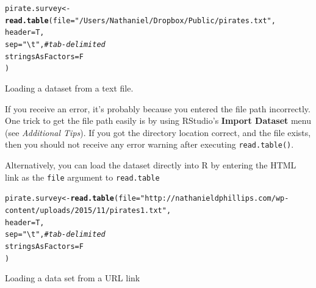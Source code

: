\documentclass{tufte-book}\usepackage[]{graphicx}\usepackage[]{color}
\makeatletter
\newcommand{\hlstr}[1]{\textcolor[rgb]{0.192,0.494,0.8}{#1}}%
\newcommand{\hlcom}[1]{\textcolor[rgb]{0.678,0.584,0.686}{\textit{#1}}}%
\newcommand{\hlstd}[1]{\textcolor[rgb]{0.345,0.345,0.345}{#1}}%
\newcommand{\hlkwb}[1]{\textcolor[rgb]{0.69,0.353,0.396}{#1}}%
\newcommand{\hlkwc}[1]{\textcolor[rgb]{0.333,0.667,0.333}{#1}}%
\newcommand{\hlkwd}[1]{\textcolor[rgb]{0.737,0.353,0.396}{\textbf{#1}}}%
\newenvironment{kframe}{%
 \def\at@end@of@kframe{}%
 \ifinner\ifhmode%
  \def\at@end@of@kframe{\end{minipage}}%
  \begin{minipage}{\columnwidth}%
 \fi\fi%
 \def\FrameCommand##1{\hskip\@totalleftmargin \hskip-\fboxsep
 \colorbox{shadecolor}{##1}\hskip-\fboxsep
     \hskip-\linewidth \hskip-\@totalleftmargin \hskip\columnwidth}%
 \MakeFramed {\advance\hsize-\width
   \@totalleftmargin\z@ \linewidth\hsize
   \@setminipage}}%
 {\par\unskip\endMakeFramed%
 \at@end@of@kframe}
\newenvironment{knitrout}{}{} %
\makeatother
\begin{document}
\vspace{5mm}
\begin{minipage}{16cm}
\begin{footnotesize}
\begin{knitrout}
\color{fgcolor}\begin{kframe}
\begin{alltt}
\hlstd{pirate.survey} \hlkwb{<-} \hlkwd{read.table}\hlstd{(}\hlkwc{file} \hlstd{=} \hlstr{"/Users/Nathaniel/Dropbox/Public/pirates.txt"}\hlstd{,}
                      \hlkwc{header} \hlstd{= T,}
                      \hlkwc{sep} \hlstd{=} \hlstr{"\textbackslash{}t"}\hlstd{,} \hlcom{# tab-delimited}
                      \hlkwc{stringsAsFactors} \hlstd{= F}
                      \hlstd{)}
\end{alltt}
\end{kframe}
\end{knitrout}
\end{footnotesize}
\caption{Loading a dataset from a text file.}
\end{minipage}
\vspace{5mm}

If you receive an error, it's probably because you entered the file path incorrectly. One trick to get the file path easily is by using RStudio's \textbf{Import Dataset} menu (see \textit{Additional Tips}). If you got the directory location correct, and the file exists, then you should not receive any error warning after executing \texttt{read.table()}.

Alternatively, you can load the dataset directly into R by entering the HTML link as the \texttt{file} argument to \texttt{read.table}



\vspace{5mm}
\begin{minipage}{16cm}
\begin{footnotesize}
\begin{knitrout}
\color{fgcolor}\begin{kframe}
\begin{alltt}
\hlstd{pirate.survey} \hlkwb{<-} \hlkwd{read.table}\hlstd{(}\hlkwc{file} \hlstd{=} \hlstr{"http://nathanieldphillips.com/wp-content/uploads/2015/11/pirates1.txt"}\hlstd{,}
                      \hlkwc{header} \hlstd{= T,}
                      \hlkwc{sep} \hlstd{=} \hlstr{"\textbackslash{}t"}\hlstd{,} \hlcom{# tab-delimited}
                      \hlkwc{stringsAsFactors} \hlstd{= F}
                      \hlstd{)}
\end{alltt}
\end{kframe}
\end{knitrout}
\end{footnotesize}
\caption{Loading a data set from a URL link}
\end{minipage}
\vspace{5mm}
\end{document}

